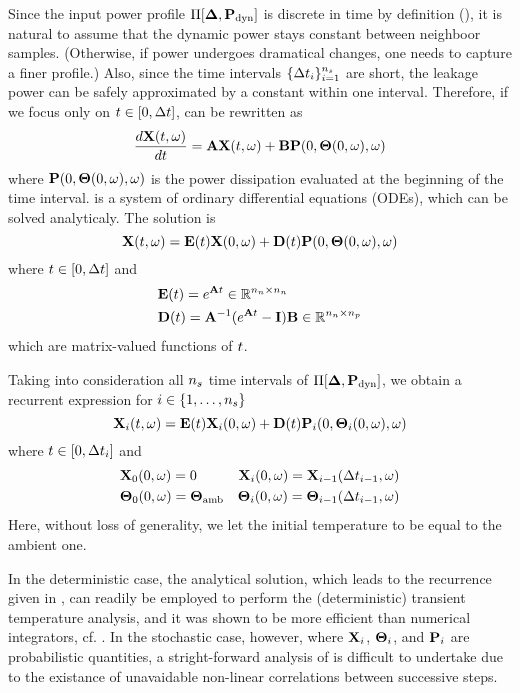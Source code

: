 Since the input power profile $\prof{\mP_\dyn}$ is discrete in time by definition (), it is natural to assume that the dynamic power stays constant between neighboor samples. (Otherwise, if power undergoes dramatical changes, one needs to capture a finer profile.) Also, since the time intervals $\{ \Delta t_i \}_{i = 1}^{{n_s}}$ are short, the leakage power can be safely approximated by a constant within one interval. Therefore, if we focus only on $t \in [0, \Delta t]$,  can be rewritten as
\begin{equation} \elabel{fourier-ode}
  \frac{d\vX(\t, \o)}{d\t} = \mA \vX(\t, \o) + \mB \vP(0, \vTO(0, \o), \o)
\end{equation}
where $\mathbf{P}(0, {\boldsymbol\Theta}(0, \omega), \omega)$ is the power dissipation evaluated at the beginning of the time interval.  is a system of ordinary differential equations (ODEs), which can be solved analyticaly. The solution is
\begin{equation} \elabel{ode-solution}
  \vX(\t, \o) = \mE(\t) \vX(0, \o) + \mD(\t) \vP(0, \vTO(0, \o), \o)
\end{equation}
where $t \in [0, \Delta t]$ and
\begin{align}
  & \mE(\t) = e^{\mA \t} \in \real^{\nodes \times \nodes} \elabel{e} \\
  & \mD(\t) = \mA^{-1} (e^{\mA \t} - \mI) \mB \in \real^{\nodes \times \cores} \elabel{d}
\end{align}
which are matrix-valued functions of $t$.

Taking into consideration all ${n_s}$ time intervals of $\prof{\mP_\dyn}$, we obtain a recurrent expression for $i \in \{ 1, \dotsc, {n_s} \}$
\begin{equation} \elabel{recurrence}
  \vX_i(\t, \o) = \mE(\t) \vX_i(0, \o) + \mD(\t) \vP_i(0, \vTO_i(0, \o), \o)
\end{equation}
where $t \in [ 0, \Delta t_i ]$ and
\begin{align*}
  & \mathbf{X}_0(0, \omega) = 0 & \mathbf{X}_i(0, \omega) = \mathbf{X}_{i - 1}(\Delta t_{i - 1}, \omega) \\
  & {\boldsymbol\Theta}_0(0, \omega) = {\boldsymbol\Theta}_{\text{amb}} & {\boldsymbol\Theta}_i(0, \omega) = {\boldsymbol\Theta}_{i - 1}(\Delta t_{i - 1}, \omega)
\end{align*}
Here, without loss of generality, we let the initial temperature to be equal to the ambient one.

In the deterministic case, the analytical solution, which leads to the recurrence given in , can readily be employed to perform the (deterministic) transient temperature analysis, and it was shown to be more efficient than numerical integrators, cf. \cite{ukhov2012}. In the stochastic case, however, where $\mathbf{X}_i$, ${\boldsymbol\Theta}_i$, and $\mathbf{P}_i$ are probabilistic quantities, a stright-forward analysis of  is difficult to undertake due to the existance of unavaidable non-linear correlations between successive steps.
